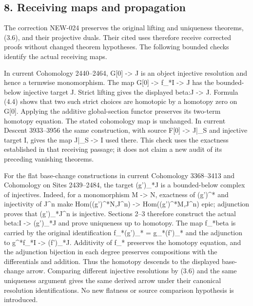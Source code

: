\documentclass[11pt]{article}
\begin{document}
\subsection{8. Receiving maps and propagation}\label{proofs-6209-7089-receiving-maps-and-propagation}

The correction NEW-024 preserves the original lifting and uniqueness theorems,\allowbreak{} (3.6)\allowbreak{},\allowbreak{} and their projective duals. Their cited uses therefore receive corrected proofs without changed theorem hypotheses. The following bounded checks identify the actual receiving maps.

In current Cohomology 2440–\allowbreak{}2464,\allowbreak{} G[0]\allowbreak{} \allowbreak{}-> J is an object injective resolution and hence a termwise monomorphism. The map G[0]\allowbreak{} \allowbreak{}-> f\_\allowbreak{}*I \allowbreak{}-> J\textquotesingle{} has the bounded-below injective target J\textquotesingle. Strict lifting gives the displayed beta:\allowbreak{}J \allowbreak{}-> J\textquotesingle. Formula (4.4)\allowbreak{} shows that two such strict choices are homotopic by a homotopy zero on G[0]\allowbreak{}. Applying the additive global-section functor preserves its two-term homotopy equation. The stated cohomology map is unchanged. In current Descent 3933–\allowbreak{}3956 the same construction,\allowbreak{} with source F[0]\allowbreak{} \allowbreak{}-> J|\_\allowbreak{}S and injective target I,\allowbreak{} gives the map J|\_\allowbreak{}S \allowbreak{}-> I used there. This check uses the exactness established in that receiving passage; it does not claim a new audit of its preceding vanishing theorems.

For the flat base-change constructions in current Cohomology 3368–\allowbreak{}3413 and Cohomology on Sites 2439–\allowbreak{}2484,\allowbreak{} the target (g')\allowbreak{}\_\allowbreak{}*J is a bounded-below complex of injectives. Indeed,\allowbreak{} for a monomorphism M \allowbreak{}-> N,\allowbreak{} exactness of (g')\allowbreak{}\textasciicircum{}* and injectivity of J\^{}n make Hom((g')\allowbreak{}\textasciicircum{}*N,\allowbreak{}J\textasciicircum{}n)\allowbreak{} \allowbreak{}-> Hom((g')\allowbreak{}\textasciicircum{}*M,\allowbreak{}J\textasciicircum{}n)\allowbreak{} epic; adjunction proves that (g')\allowbreak{}\_\allowbreak{}*J\textasciicircum{}n is injective. Sections 2–\allowbreak{}3 therefore construct the actual beta:\allowbreak{}I \allowbreak{}-> (g')\allowbreak{}\_\allowbreak{}*J and prove uniqueness up to homotopy. The map f\_\allowbreak{}*beta is carried by the original identification f\_\allowbreak{}*(g')\allowbreak{}\_\allowbreak{}* \allowbreak{}= g\_\allowbreak{}*(f')\allowbreak{}\_\allowbreak{}* and the adjunction to g\textasciicircum{}*f\_\allowbreak{}*I \allowbreak{}-> (f')\allowbreak{}\_\allowbreak{}*J. Additivity of f\_\allowbreak{}* preserves the homotopy equation,\allowbreak{} and the adjunction bijection in each degree preserves compositions with the differentials and addition. Thus the homotopy descends to the displayed base-change arrow. Comparing different injective resolutions by (3.6)\allowbreak{} and the same uniqueness argument gives the same derived arrow under their canonical resolution identifications. No new flatness or source comparison hypothesis is introduced.
\end{document}
